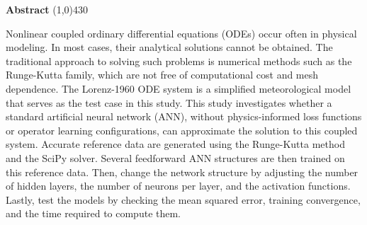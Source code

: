 \setlength{\headheight}{14pt}
\begin{center}
	{\huge \bf Abstract}
	\line(1,0){430}
\end{center}
Nonlinear coupled ordinary differential equations (ODEs) occur often in physical modeling. In most cases, their analytical solutions cannot be obtained. The traditional approach to solving such problems is numerical methods such as the Runge-Kutta family, which are not free of computational cost and mesh dependence. The Lorenz-1960 ODE system is a simplified meteorological model that serves as the test case in this study. This study investigates whether a standard artificial neural network (ANN), without physics-informed loss functions or operator learning configurations, can approximate the solution to this coupled system. Accurate reference data are generated using the Runge-Kutta method and the SciPy solver. Several feedforward ANN structures are then trained on this reference data. Then, change the network structure by adjusting the number of hidden layers, the number of neurons per layer, and the activation functions. Lastly, test the models by checking the mean squared error, training convergence, and the time required to compute them.

\clearpage
\setlength{\headheight}{12pt}